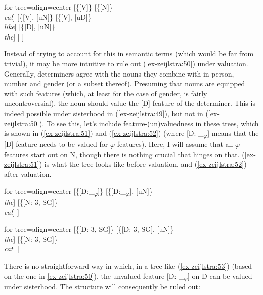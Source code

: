 \documentclass[output=paper
,modfonts
,nonflat]{langsci/langscibook}
\begin{document}
\ea\label{ex-zeijlstra:50}
			\begin{forest}	for tree={align=center}
				[\{{[}V{]}\}
				[\{{[}N{]}\}\\ \textit{cat}]
				[\{{[}V{]}{,} {[}uN{]}\}
				[\{{[}V{]}{,} {[}uD{]}\}\\ \textit{like}]
				[\{{[}D{]}{,} {[}uN{]}\}\\ \textit{the}]
				] ] 
		\end{forest}\z
\noindent Instead of trying to account for this in semantic terms (which would be far from trivial), it may be more intuitive to rule out (\ref{ex-zeijlstra:50}) under valuation. Generally, determiners agree with the nouns they combine with in person, number and gender (or a subset thereof). Presuming that nouns are equipped with such features (which, at least for the case of gender, is fairly uncontroversial), the noun should value the [D]-feature of the determiner. This is indeed possible under sisterhood in (\ref{ex-zeijlstra:49}), but not in (\ref{ex-zeijlstra:50}). To see this, let’s include feature-(un)valuedness in these trees, which is shown in (\ref{ex-zeijlstra:51}) and (\ref{ex-zeijlstra:52}) (where [D: \_\textsubscript{$\varphi$}] means that the [D]-feature needs to be valued for $\varphi$-features). Here, I will assume that all $\varphi$-features start out on N, though there is nothing crucial that hinges on that. (\ref{ex-zeijlstra:51}) is what the tree looks like before valuation, and (\ref{ex-zeijlstra:52}) after valuation.

\begin{exe}
\ex \label{ex-zeijlstra:51}
			\begin{forest}	for tree={align=center}
				[\{{[}D:\_\textsubscript{$\varphi$}{]}\}
				[\{{[}D:\_\textsubscript{$\varphi$}{]}{,} {[}uN{]}\}\\ \textit{the}]
				[\{{[}N: 3{,} SG{]}\}\\ \textit{cat}]
				]  
		\end{forest}
\ex\label{ex-zeijlstra:52}
			\begin{forest}	for tree={align=center}
				[\{{[}D: 3{,} SG{]}\}
				[\{{[}D: 3{,} SG{]}{,} {[}uN{]}\}\\ \textit{the}]
				[\{{[}N: 3{,} SG{]}\}\\ \textit{cat}]
				]  
		\end{forest}
\end{exe}

\noindent There is no straightforward way in which, in a tree like (\ref{ex-zeijlstra:53}) (based on the one in \ref{ex-zeijlstra:50}), the unvalued feature [D: \_\textsubscript{$\varphi$}] on D can be valued under sisterhood. The structure will consequently be ruled out:
\end{document}

